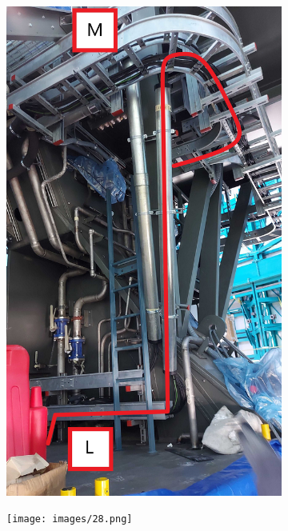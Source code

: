 \begin{figure}
  \centering
  \begin{subfigure}{0.40\textwidth}
    \centering
    \includegraphics[width=\textwidth]{images/27.jpg}
  \end{subfigure}
  \hfill
  \begin{subfigure}{0.40\textwidth}
    \centering
    \texttt{[image: images/28.png]}
  \end{subfigure}
\end{figure}

